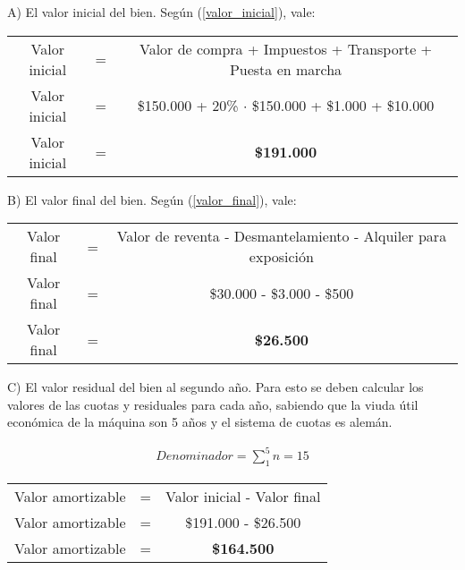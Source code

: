 \documentclass[12pt,a4paper]{article}
\begin{document}
        A) El valor inicial del bien. Según (\ref{valor_inicial}), vale:

		\begin{table}[H]
		\centering
        	\begin{tabular}{ c c c }
            	Valor inicial	&=&		Valor de compra + Impuestos + Transporte + Puesta en marcha \\
                Valor inicial	&=&		\$150.000 + 20\% $\cdot$ \$150.000 + \$1.000 + \$10.000 \\
                Valor inicial	&=&		\textbf{\$191.000}
			\end{tabular}
		\end{table}
        
        \hrulefill
        
        B) El valor final del bien. Según (\ref{valor_final}), vale:

		\begin{table}[H]
		\centering
        	\begin{tabular}{ c c c }
            	Valor final	&=&		Valor de reventa - Desmantelamiento - Alquiler para exposición \\
                Valor final	&=&		\$30.000 - \$3.000 - \$500 \\
                Valor final	&=&		\textbf{\$26.500}
			\end{tabular}
		\end{table}
        
        \hrulefill
        
        C) El valor residual del bien al segundo año. Para esto se deben calcular los valores de las cuotas y residuales para cada año, sabiendo que la viuda útil económica de la máquina son 5 años y el sistema de cuotas es alemán.
        
        \begin{align*}
        	Denominador = \sum_{1}^{5} n = 15
		\end{align*}
        
		\begin{table}[H]
		\centering
        	\begin{tabular}{ c c c }
            	Valor amortizable	&=&		Valor inicial - Valor final \\
                Valor amortizable	&=&		\$191.000 - \$26.500 \\
                Valor amortizable	&=&		\textbf{\$164.500}
			\end{tabular}
		\end{table}
        
\end{document}
